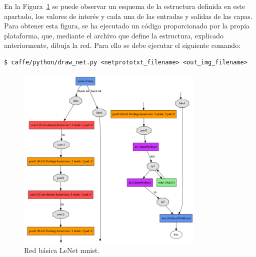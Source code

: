	En la Figura~\ref{fig.redBasica} se puede observar un esquema de la estructura definida en este apartado, los valores de interés y cada una de las entradas y salidas de las capas. Para obtener esta figura, se ha ejecutado un código proporcionado por la propia plataforma, que, mediante el archivo que define la estructura, explicado anteriormente, dibuja la red. Para ello se debe ejecutar el siguiente comando:
	\vspace{10pt}
	\begin{lstlisting}[frame=single]
	$ caffe/python/draw_net.py <netprototxt_filename> <out_img_filename>
	\end{lstlisting}
	
	\begin{figure}[H]
		\begin{center}
			\includegraphics[width=0.8\textwidth]{figures/Original_net}
			\caption{Red básica LeNet \acrshort{mnist}.}
			\label{fig.redBasica}
		\end{center}
	\end{figure}
	
